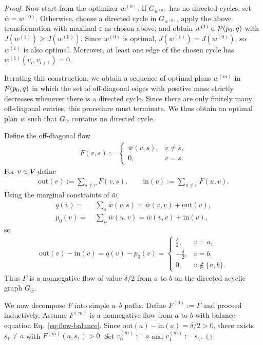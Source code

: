 \begin{proof}
Now start from the optimizer $w^{(0)}$.  
If $G_{w^{(0)}}$ has no directed cycles, set $\bar w = w^{(0)}$.
Otherwise, choose a directed cycle in $G_{w^{(0)}}$, apply the above
transformation with maximal $\varepsilon$ as chosen above, and obtain
$w^{(1)}\in\mathcal{P}(p_0,q)$ with $J(w^{(1)})\ge J(w^{(0)})$.
Since $w^{(0)}$ is optimal, $J(w^{(1)})=J(w^{(0)})$, so $w^{(1)}$ is also
optimal.  Moreover, at least one edge of the chosen cycle has
$w^{(1)}(v_i,v_{i+1})=0$.

Iterating this construction, we obtain a sequence of optimal plans
$w^{(m)}$ in $\mathcal{P}(p_0,q)$ in which the set of off-diagonal edges with
positive mass strictly decreases whenever there is a directed cycle.
Since there are only finitely many off-diagonal entries, this procedure
must terminate.  We thus obtain an optimal plan $\bar w$ such that
$G_{\bar w}$ contains no directed cycle.

\medskip
Define the off-diagonal flow\begin{align*}
    F(v,s) :=
    \begin{cases}
        \bar w(v,s), & v\neq s,\\
        0, & v=s.
    \end{cases}
\end{align*}
For $v\in\mathcal{V}$ define
\begin{align*}
    \text{out}(v) := \sum_{s\neq v} F(v,s),
    \qquad
    \text{in}(v)  := \sum_{u\neq v} F(u,v).
\end{align*}
Using the marginal constraints of $\bar w$,
\begin{align*}
    q(v) = &~ \sum_s \bar w(v,s)
          = \bar w(v,v) + \text{out}(v),\\
    p_0(v) = &~ \sum_u \bar w(u,v)
            = \bar w(v,v) + \text{in}(v),
\end{align*}
so
\begin{align}
    \text{out}(v) - \text{in}(v)
    = q(v)-p_0(v)
    =
    \begin{cases}
        \frac{\delta}{2}, & v=a,\\ 
        -\frac{\delta}{2}, & v=b,\\
        0, & v\notin\{a,b\}.
    \end{cases}
    \label{eq:flow-balance}
\end{align}
Thus $F$ is a nonnegative flow of value $\delta/2$ from $a$ to $b$ on the
directed acyclic graph $G_{\bar w}$.

We now decompose $F$ into simple $a$–$b$ paths.
Define $F^{(0)}:=F$ and proceed inductively.
Assume $F^{(m)}$ is a nonnegative flow from $a$ to $b$ with balance
equation Eq.~\eqref{eq:flow-balance}.
Since $\text{out}(a)-\text{in}(a)=\delta/2>0$, there exists
$s_1\neq a$ with $F^{(m)}(a,s_1)>0$.
Set $v_0^{(m)}:=a$ and $v_1^{(m)}:=s_1$.



\end{proof}
